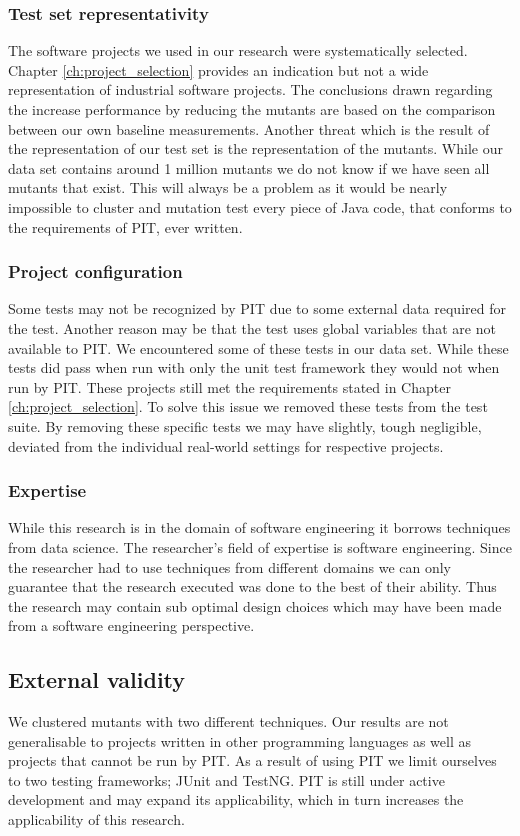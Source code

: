 \documentclass[../main]{subfiles}
\begin{document}
\subsubsection{Test set representativity}
The software projects we used in our research were systematically selected.
Chapter \ref{ch:project_selection} provides an indication but not a wide representation of industrial software projects.
The conclusions drawn regarding the increase performance by reducing the mutants are based on the comparison between our own baseline measurements.
Another threat which is the result of the representation of our test set is the representation of the mutants.
While our data set contains around 1 million mutants we do not know if we have seen all mutants that exist.
This will always be a problem as it would be nearly impossible to cluster and mutation test every piece of Java code, that conforms to the requirements of PIT, ever written.

\subsubsection{Project configuration}
Some tests may not be recognized by PIT due to some external data required for the test.
Another reason may be that the test uses global variables that are not available to PIT.
We encountered some of these tests in our data set.
While these tests did pass when run with only the unit test framework they would not when run by PIT.
These projects still met the requirements stated in Chapter \ref{ch:project_selection}.
To solve this issue we removed these tests from the test suite.
By removing these specific tests we may have slightly, tough negligible, deviated from the individual real-world settings for respective projects.

\subsubsection{Expertise}
While this research is in the domain of software engineering it borrows techniques from data science.
The researcher's field of expertise is software engineering.
Since the researcher had to use techniques from different domains we can only guarantee that the research executed was done to the best of their ability.
Thus the research may contain sub optimal design choices which may have been made from a software engineering perspective.

\subsection{External validity}
We clustered mutants with two different techniques.
Our results are not generalisable to projects written in other programming languages as well as projects that cannot be run by PIT.
As a result of using PIT we limit ourselves to two testing frameworks; JUnit and TestNG.
PIT is still under active development and may expand its applicability, which in turn increases the applicability of this research.
\end{document}
